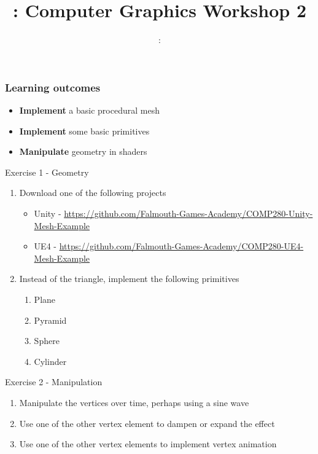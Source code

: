 \usepackage{../../beamerthemeFalmouthGamesAcademy}
\usepackage{multimedia}
\graphicspath{ {../../} }


\usepackage[normalem]{ulem}
\usepackage{wasysym}

\usepackage{pdfpages}

\usetikzlibrary{arrows,automata}




\title{\sessionnumber: Computer Graphics Workshop 2}
\subtitle{\modulecode: \moduletitle}

\frame{\titlepage} 

\begin{frame}
	\frametitle{Learning outcomes}
	\begin{itemize}
		\item \textbf{Implement} a basic procedural mesh
		\item \textbf{Implement} some basic primitives
		\item \textbf{Manipulate} geometry in shaders
	\end{itemize}
\end{frame}

\begin{frame}{Exercise 1 - Geometry}
	\begin{enumerate}
		\item Download one of the following projects
		\begin{itemize}
			\item Unity - \url{https://github.com/Falmouth-Games-Academy/COMP280-Unity-Mesh-Example}
			\item UE4 - \url{https://github.com/Falmouth-Games-Academy/COMP280-UE4-Mesh-Example}
		\end{itemize}
		\item Instead of the triangle, implement the following primitives
		\begin{enumerate}
			\item Plane
			\item Pyramid 
			\item Sphere
			\item Cylinder
		\end{enumerate}
	\end{enumerate}
\end{frame}

\begin{frame}{Exercise 2 - Manipulation}
	\begin{enumerate}
		\item Manipulate the vertices over time, perhaps using a sine wave
		\item Use one of the other vertex element to dampen or expand the effect
		\item Use one of the other vertex elements to implement vertex animation
	\end{enumerate}
\end{frame}

